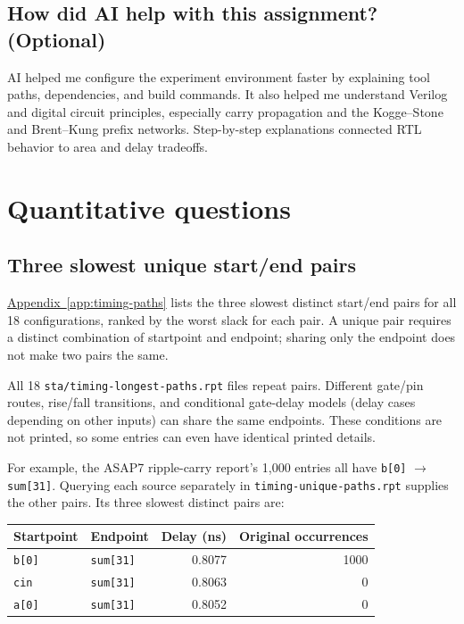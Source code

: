 \documentclass[10pt,letterpaper]{article}
\begin{document}
\subsection{How did AI help with this assignment? (Optional)}
AI helped me configure the experiment environment faster by explaining tool
paths, dependencies, and build commands. It also helped me understand Verilog
and digital circuit principles, especially carry propagation and the
Kogge--Stone and Brent--Kung prefix networks. Step-by-step explanations
connected RTL behavior to area and delay tradeoffs.

\section{Quantitative questions}
\subsection{Three slowest unique start/end pairs}
\hyperref[app:timing-paths]{Appendix~\ref*{app:timing-paths}} lists the three
slowest distinct start/end pairs for all 18 configurations, ranked by the
worst slack for each pair. A unique pair requires a distinct combination of
startpoint and endpoint; sharing only the endpoint does not make two pairs
the same.

All 18 \texttt{sta/timing-longest-paths.rpt} files repeat pairs. Different
gate/pin routes, rise/fall transitions, and conditional gate-delay models
(delay cases depending on other inputs) can share the same endpoints.
These conditions are not printed, so some entries can even have identical
printed details.

For example, the ASAP7 ripple-carry report's 1,000 entries all have
\texttt{b[0]} $\rightarrow$ \texttt{sum[31]}. Querying each source separately
in \texttt{timing-unique-paths.rpt} supplies the other pairs. Its three
slowest distinct pairs are:


\begin{center}\small
\begin{tabular}{llrr}
\toprule
Startpoint & Endpoint & Delay (ns) & Original occurrences \\
\midrule
\texttt{b[0]} & \texttt{sum[31]} & 0.8077 & 1000 \\
\texttt{cin} & \texttt{sum[31]} & 0.8063 & 0 \\
\texttt{a[0]} & \texttt{sum[31]} & 0.8052 & 0 \\
\bottomrule
\end{tabular}
\end{center}
\end{document}
